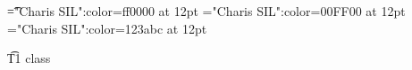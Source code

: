 \documentclass[a4paper]{article}
\begin{document}
\pagestyle{plain}
\sloppy
\setlength{\parfillskip}{0pt plus 1fil}
\font\t="Charis SIL":color=ff0000 at 12pt
\font\zt="Charis SIL":color=00FF00 at 12pt
\font\wzt="Charis SIL":color=123abc at 12pt

\newpage 
\thispagestyle{empty} 
\mbox{} 
\newpage 
\newpage 
\setcounter{page}{1} 
\pagestyle{fancy} 

\t{T1 class }


\end{document}
